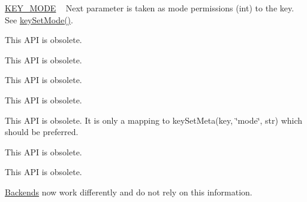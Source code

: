 \begin{DoxyRefList}
\begin{DoxyItemize}
\item \mbox{\hyperlink{group__key_gga91fb3178848bd682000958089abbaf40a1b0a91ff3a855d6993930ebf0abaa518}{K\+E\+Y\+\_\+\+M\+O\+DE}} ~\newline
 Next parameter is taken as mode permissions (int) to the key. See \mbox{\hyperlink{group__meta_ga8803037e35b9da1ce492323a88ff6bc3}{key\+Set\+Mode()}}.  
\end{DoxyItemize}
\item[Member \mbox{\hyperlink{group__meta_ga995d8b84731673c88c7c01f3fed538b9}{key\+Set\+A\+Time}} (\mbox{\hyperlink{classkdb_1_1Key}{Key}} $\ast$key, time\+\_\+t atime)]\label{deprecated__deprecated000022}%
%
This A\+PI is obsolete. 
\item[Member \mbox{\hyperlink{group__meta_ga9f502ecab8ab43f0b17220fcc95f3fa5}{key\+Set\+C\+Time}} (\mbox{\hyperlink{classkdb_1_1Key}{Key}} $\ast$key, time\+\_\+t ctime)]\label{deprecated__deprecated000026}%
%
This A\+PI is obsolete. 
\item[Member \mbox{\hyperlink{group__meta_gaae575bd86a628a15ee45baa860522e75}{key\+Set\+Dir}} (\mbox{\hyperlink{classkdb_1_1Key}{Key}} $\ast$key)]\label{deprecated__deprecated000018}%
%
This A\+PI is obsolete. 
\item[Member \mbox{\hyperlink{group__meta_ga9e3d0fb3f7ba906e067727b9155d22e3}{key\+Set\+G\+ID}} (\mbox{\hyperlink{classkdb_1_1Key}{Key}} $\ast$key, gid\+\_\+t gid)]\label{deprecated__deprecated000017}%
%
This A\+PI is obsolete. 
\item[Member \mbox{\hyperlink{group__meta_ga8803037e35b9da1ce492323a88ff6bc3}{key\+Set\+Mode}} (\mbox{\hyperlink{classkdb_1_1Key}{Key}} $\ast$key, mode\+\_\+t mode)]\label{deprecated__deprecated000020}%
%
This A\+PI is obsolete. It is only a mapping to key\+Set\+Meta(key, \char`\"{}mode\char`\"{}, str) which should be preferred. 
\item[Member \mbox{\hyperlink{group__meta_ga481d8997187992fe4bbf288bc8ef4db7}{key\+Set\+M\+Time}} (\mbox{\hyperlink{classkdb_1_1Key}{Key}} $\ast$key, time\+\_\+t mtime)]\label{deprecated__deprecated000024}%
%
This A\+PI is obsolete. 
\item[Member \mbox{\hyperlink{group__meta_gab5f284f5ecd261e0a290095f50ba1af7}{key\+Set\+U\+ID}} (\mbox{\hyperlink{classkdb_1_1Key}{Key}} $\ast$key, uid\+\_\+t uid)]\label{deprecated__deprecated000015}%
%
This A\+PI is obsolete. 
\item[Member \mbox{\hyperlink{group__keyset_ga8f210432e664d8ba06d7d55a2aba2d0f}{ks\+Need\+Sync}} (const \mbox{\hyperlink{classkdb_1_1KeySet}{Key\+Set}} $\ast$ks)]\label{deprecated__deprecated000011}%
%
\mbox{\hyperlink{classkdb_1_1tools_1_1Backends}{Backends}} now work differently and do not rely on this information.
\end{DoxyRefList}